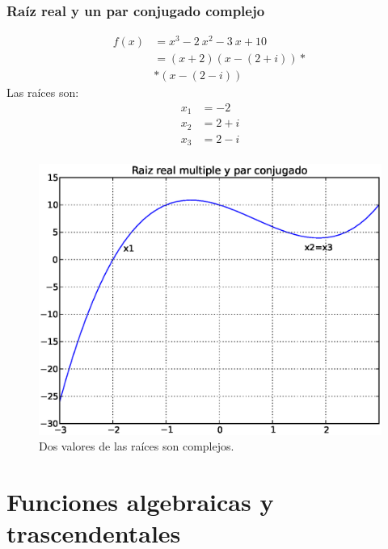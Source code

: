 \begin{frame}[fragile]
\captionsetup{justification=centering}
\frametitle{Raíz real y un par conjugado complejo}
\begin{minipage}{5cm}
\fontsize{12}{12}\selectfont
\begin{align*}
f(x) &= x^{3} - 2 \: x^{2} - 3 \: x + 10  \\
&= (x + 2)(x - (2 + i))* {}\\
&* (x - (2 - i))
\end{align*}
Las raíces son:
\begin{align*}
x_{1} &= -2 \\
x_{2} &= 2 + i \\
x_{3} &= 2 - i \\
\end{align*}
\end{minipage}
\hspace{0.5cm}
\begin{minipage}{4.5cm}
\begin{figure}
	\centering
	\includegraphics[scale=0.3]{Imagenes/raices04.eps} 
	\caption{Dos valores de las raíces son complejos.}
\end{figure}
\end{minipage}
\end{frame}
\section{Funciones algebraicas y trascendentales}
